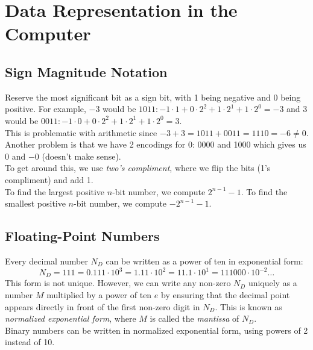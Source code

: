 \documentclass{article}
\begin{document}
	\section{Data Representation in the Computer}
	
	\subsection{Sign Magnitude Notation}
	
	Reserve the most significant bit as a sign bit, with 1 being negative and 0 being positive. For example, $ -3 $ would be $ 1011 : -1\cdot 1 + 0 \cdot 2^2 + 1 \cdot 2^1 + 1 \cdot 2^0 = -3 $ and 3 would be $ 0011 : -1\cdot 0 + 0 \cdot 2^2 + 1 \cdot 2^1 + 1 \cdot 2^0 = 3 $.\\
	
	This is problematic with arithmetic since $-3 + 3 = 1011 + 0011 = 1110 = -6 \neq 0 $. Another problem is that we have 2 encodings for 0: 0000 and 1000 which gives us 0 and $ -0 $ (doesn't make sense).\\
	
	To get around this, we use \textit{two's compliment}, where we flip the bits (1's compliment) and add 1.\\
	
	To find the largest positive $ n $-bit number, we compute $ 2^{n-1}-1 $. To find the smallest positive $ n $-bit number, we compute $ -2^{n-1}-1 $.
	
	\subsection{Floating-Point Numbers}
	
	Every decimal number $ N_D $ can be written as a power of ten in exponential form:
	\[
		N_D = 111 = 0.111 \cdot 10^3 = 1.11 \cdot 10^2 = 11.1 \cdot 10^1 = 111000 \cdot 10^{-2} \dots
	\]
	This form is not unique. However, we can write any non-zero $ N_D $ uniquely as a number $ M $ multiplied by a power of ten $ e $ by ensuring that the decimal point appears directly in front of the first non-zero digit in $ N_D $. This is known as \textit{normalized exponential form}, where $ M $ is called the \textit{mantissa} of $ N_D $.\\
	
	Binary numbers can be written in normalized exponential form, using powers of 2 instead of 10.
	
	\begin{figure}[!h]
		\centering
	\end{figure}
	
\end{document}
